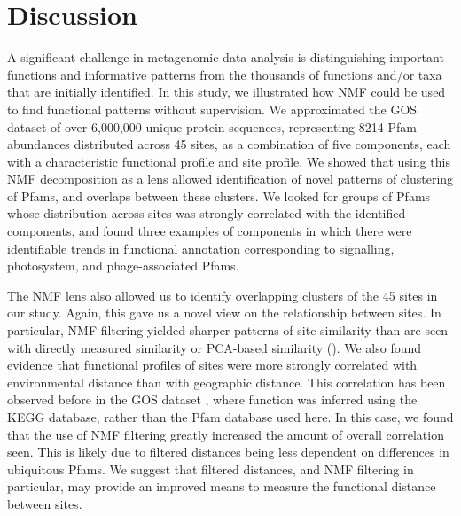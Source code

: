 
\section{Discussion}

A significant challenge in metagenomic data analysis is distinguishing important functions and informative patterns from the thousands of functions and/or taxa that are initially identified. In this study, we illustrated how NMF could be used to find functional patterns without supervision.  We approximated the GOS dataset of over 6,000,000 unique protein sequences, representing 8214 Pfam abundances distributed across 45 sites, as a combination of five components, each with a characteristic functional profile and site profile. We showed that using this NMF decomposition as a lens allowed identification of novel patterns of clustering of Pfams, and overlaps between these clusters.  We looked for groups of Pfams whose distribution across sites was strongly correlated with the identified components, and found three examples of components in which there were identifiable trends in functional annotation corresponding to signalling, photosystem, and phage-associated Pfams.

The NMF lens also allowed us to identify overlapping clusters of the 45 sites in our study.  Again, this gave us a novel view on the relationship between sites.   In particular, NMF filtering yielded sharper patterns of site similarity than are seen with directly measured similarity or PCA-based similarity (). We also found evidence that functional profiles of sites were more strongly correlated with environmental distance than with geographic distance.  This correlation has been observed before in the GOS dataset \cite{RaesLetu11}, where function was inferred using the KEGG database, rather than the Pfam database used here.  In this case, we found that the use of NMF filtering greatly increased the amount of overall correlation seen.  This is likely due to filtered distances being less dependent on differences in ubiquitous Pfams.  We suggest that filtered distances, and NMF filtering in particular, may provide an improved means to measure the functional distance between sites.

